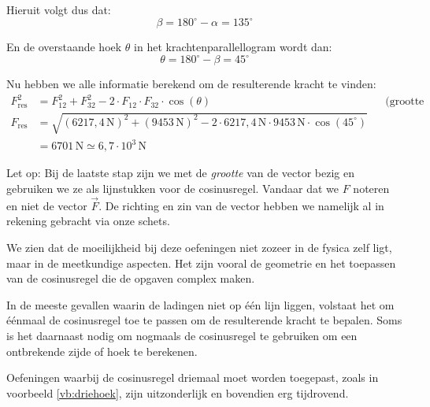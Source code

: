 \documentclass{ximera}
\begin{document}
\begin{example}[foldable=true,title={Voorbeeld: drie ladingen niet op een lijn}]
\begin{solution}
        Hieruit volgt dus dat:
        \begin{equation*}
            \beta = 180^\circ - \alpha = 135^\circ
        \end{equation*}
        
        En de overstaande hoek $\theta$ in het krachtenparallellogram wordt dan:
        \begin{equation*}
            \theta = 180^\circ - \beta = 45^\circ
        \end{equation*}
        
        Nu hebben we alle informatie berekend om de resulterende kracht te vinden:
        \begin{align*}
            F^{2}_{\text{res}} &= F^{2}_{12} + F^{2}_{32} - 2 \cdot F_{12} \cdot F_{32} \cdot \cos(\theta) && \text{(grootte vectoren via cosinusregel)} \\
            F_{\text{res}} &= \sqrt{(6217{,}4 \, \mathrm{N})^{2} + (9453 \, \mathrm{N})^{2} - 2 \cdot 6217{,}4 \, \mathrm{N} \cdot 9453 \, \mathrm{N} \cdot \cos(45^\circ)} \\
            &= 6701 \, \mathrm{N} \simeq \boxed{6{,}7 \cdot 10^3 \, \mathrm{N}}
        \end{align*}
        
        \begin{hint}
            Let op: Bij de laatste stap zijn we met de \textit{grootte} van de vector bezig en gebruiken we ze als lijnstukken voor de cosinusregel. Vandaar dat we $F$ noteren en niet de vector $\vec{F}$. De richting en zin van de vector hebben we namelijk al in rekening gebracht via onze schets.
        \end{hint}
    \end{solution}
\end{example}

We zien dat de moeilijkheid bij deze oefeningen niet zozeer in de fysica zelf ligt, maar in de meetkundige aspecten. Het zijn vooral de geometrie en het toepassen van de cosinusregel die de opgaven complex maken.

In de meeste gevallen waarin de ladingen niet op één lijn liggen, volstaat het om éénmaal de cosinusregel toe te passen om de resulterende kracht te bepalen. Soms is het daarnaast nodig om nogmaals de cosinusregel te gebruiken om een ontbrekende zijde of hoek te berekenen.

Oefeningen waarbij de cosinusregel driemaal moet worden toegepast, zoals in voorbeeld \ref{vb:driehoek}, zijn uitzonderlijk en bovendien erg tijdrovend.
\end{document}
